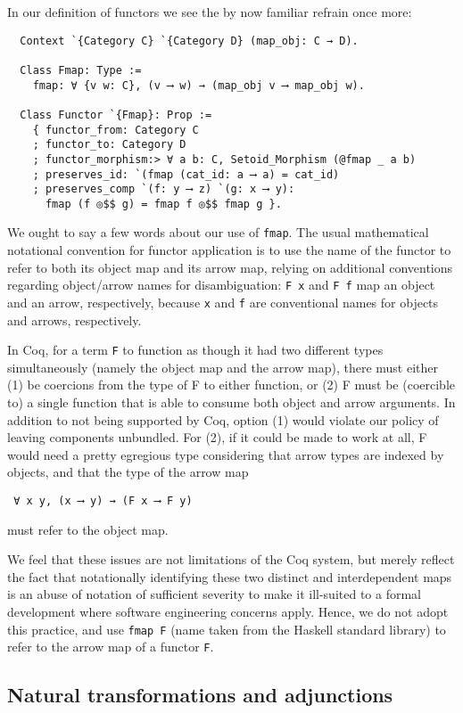 \documentclass[a4paper,10pt,runningheads]{llncs}
\begin{document}
In our definition of functors we see the by now familiar refrain once more:
\begin{lstlisting}
  Context `{Category C} `{Category D} (map_obj: C → D).

  Class Fmap: Type :=
    fmap: ∀ {v w: C}, (v ⟶ w) → (map_obj v ⟶ map_obj w).

  Class Functor `{Fmap}: Prop :=
    { functor_from: Category C
    ; functor_to: Category D
    ; functor_morphism:> ∀ a b: C, Setoid_Morphism (@fmap _ a b)
    ; preserves_id: `(fmap (cat_id: a ⟶ a) = cat_id)
    ; preserves_comp `(f: y ⟶ z) `(g: x ⟶ y):
      fmap (f ◎$$ g) = fmap f ◎$$ fmap g }.
\end{lstlisting}
We ought to say a few words about our use of \lstinline|fmap|. The usual mathematical notational convention for functor application is to use the name of the functor to refer to both its object map and its arrow map, relying on additional conventions regarding object/arrow names for disambiguation: \lstinline|F x| and \lstinline|F f| map an object and an arrow, respectively, because \lstinline|x| and \lstinline|f| are conventional names for objects and arrows, respectively.

In Coq, for a term \lstinline|F| to function as though it had two different types simultaneously (namely the object map and the arrow map), there must either (1) be coercions from the type of F to either function, or (2) F must be (coercible to) a single function that is able to consume both object and arrow arguments. In addition to not being supported by Coq, option (1) would violate our policy of leaving components unbundled. For (2), if it could be made to work at all, F would need a pretty egregious type considering that arrow types are indexed by objects, and that the type of the arrow map
\begin{lstlisting}
 ∀ x y, (x ⟶ y) → (F x ⟶ F y)
\end{lstlisting}
must refer to the object map.

We feel that these issues are not limitations of the Coq system, but merely reflect the fact that notationally identifying these two distinct and interdependent maps is an abuse of notation of sufficient severity to make it ill-suited to a formal development where software engineering concerns apply. Hence, we do not adopt this practice, and use \lstinline|fmap F| (name taken from the Haskell standard library) to refer to the arrow map of a functor \lstinline|F|.

\subsection{Natural transformations and adjunctions}
\end{document}
